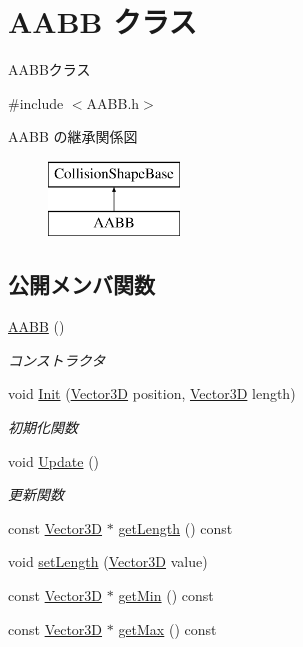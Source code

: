 \hypertarget{class_a_a_b_b}{}\section{A\+A\+BB クラス}
\label{class_a_a_b_b}


A\+A\+B\+Bクラス  




{\ttfamily \#include $<$A\+A\+B\+B.\+h$>$}

A\+A\+BB の継承関係図\begin{figure}[H]
\begin{center}
\leavevmode
\includegraphics[height=2.000000cm]{class_a_a_b_b}
\end{center}
\end{figure}
\subsection*{公開メンバ関数}
\begin{DoxyCompactItemize}
\item 
\mbox{\hyperlink{class_a_a_b_b_a5f5baf6c533905aa1456b3a3eb57bab2}{A\+A\+BB}} ()
\begin{DoxyCompactList}\small\item\em コンストラクタ \end{DoxyCompactList}\item 
void \mbox{\hyperlink{class_a_a_b_b_a28167704c3b21de2ae9f70ac139781c4}{Init}} (\mbox{\hyperlink{class_vector3_d}{Vector3D}} position, \mbox{\hyperlink{class_vector3_d}{Vector3D}} length)
\begin{DoxyCompactList}\small\item\em 初期化関数 \end{DoxyCompactList}\item 
void \mbox{\hyperlink{class_a_a_b_b_a9698fec7358275832b6b84a146ea4a7c}{Update}} ()
\begin{DoxyCompactList}\small\item\em 更新関数 \end{DoxyCompactList}\item 
const \mbox{\hyperlink{class_vector3_d}{Vector3D}} $\ast$ \mbox{\hyperlink{class_a_a_b_b_a74b2c6a6acde4bf37eb0333358349fca}{get\+Length}} () const
\item 
void \mbox{\hyperlink{class_a_a_b_b_a76816b1eb872408d91dfa6880e5af109}{set\+Length}} (\mbox{\hyperlink{class_vector3_d}{Vector3D}} value)
\item 
const \mbox{\hyperlink{class_vector3_d}{Vector3D}} $\ast$ \mbox{\hyperlink{class_a_a_b_b_a9a18cef6c33dd579c144700c79ea39f5}{get\+Min}} () const
\item 
const \mbox{\hyperlink{class_vector3_d}{Vector3D}} $\ast$ \mbox{\hyperlink{class_a_a_b_b_a8dc63902fbb2c8f83185bbe9feaaa4b0}{get\+Max}} () const
\end{DoxyCompactItemize}
